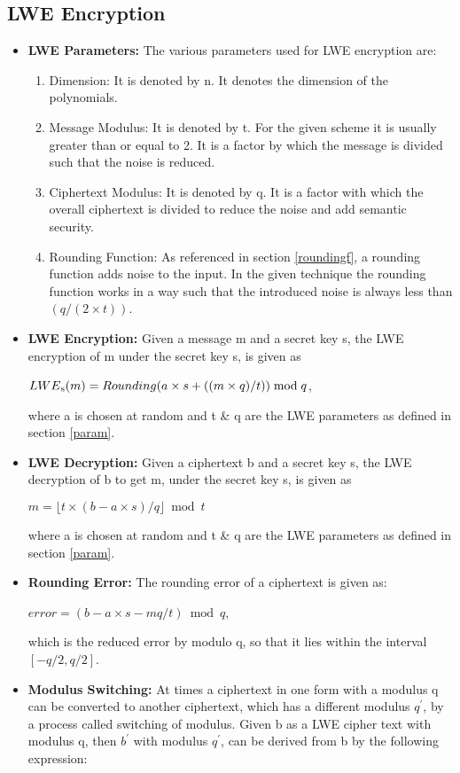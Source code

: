 \subsection{LWE Encryption}
\begin{itemize}
\item
\textbf{LWE Parameters:} \label{param}The various parameters used for LWE encryption are:
\begin{enumerate}
\item
Dimension: It is denoted by n. It denotes the dimension of the polynomials.
\item
Message Modulus: It is denoted by t. For the given scheme it is usually greater than or equal to 2. It is a factor by which the message is divided such that the noise is reduced. 
\item
Ciphertext Modulus: It is denoted by q. It is a factor with which the overall ciphertext is divided to reduce the noise and add semantic security.
\item
Rounding Function: As referenced in section \ref{roundingf}, a rounding function adds noise to the input. In the given technique the rounding function works in a way such that the introduced noise is always less than $(q/(2\times t))$.
\end{enumerate}
\item
\textbf{LWE Encryption:} Given a message m and a secret key s, the LWE encryption of m under the secret key s, is given as

\hspace{3cm}
$LWE\textsubscript{s}(m)=Rounding(a\times s+((m\times q)/t))\bmod q$,

where a is chosen at random and t \& q are the LWE parameters as defined in section \ref{param}.
\item
\textbf{LWE Decryption:} Given a ciphertext b and a secret key s, the LWE decryption of b to get m, under the secret key s, is given as

\hspace{3cm}
  $m=\lfloor{t\times (b-a\times s)/q}\rfloor \bmod t$  


where a is chosen at random and t \& q are the LWE parameters as defined in section \ref{param}.
\item
\textbf{Rounding Error:} The rounding error of a ciphertext is given as: 

\hspace{3cm}$error=(b-a\times s-mq/t)\bmod q$,

which is the reduced error by modulo q, so that it lies within the interval $[-q/2, q/2]$.
\item
\textbf{Modulus Switching:} At times a ciphertext in one form with a modulus q can be converted to another ciphertext, which has a different modulus $q^{'}$, by a process called switching of modulus. Given b as a LWE cipher text with modulus q, then $b^{'}$ with modulus $q^{'}$, can be derived from b by the following expression:


\end{itemize}
